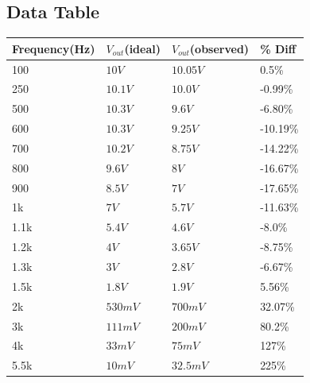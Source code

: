 \documentclass[11pt]{article}
\begin{document}
	\subsection*{Data Table}
		\begin{table}[H]
		\def\arraystretch{1.2}%
		\centering
		\begin{tabular}{|l|l|l|l|}
			\hline
			Frequency(Hz)		& $V_{out}$(ideal)		&  $V_{out}$(observed) 			&\% Diff	\\ \hline
			100  				& $10V$						& $10.05V$        			&0.5\%		\\ \hline	
			250					& $10.1V $					& $10.0V $    				&-0.99\%	\\ \hline
			500					& $10.3V$					& $9.6V$					&-6.80\%	\\ \hline
			600					& $10.3V$					& $9.25V$					&-10.19\%	\\ \hline
			700					& $10.2V$					& $8.75V$					&-14.22\%	\\ \hline
			800					& $9.6V$					& $8V$						&-16.67\%	\\ \hline
			900					& $8.5V$					& $7V$						&-17.65\%	\\ \hline
			1k					& $7V$						& $5.7V$					&-11.63\%	\\ \hline
			1.1k				& $5.4V$					& $4.6V$					&-8.0\%		\\ \hline
			1.2k				& $4V$						& $3.65V$					&-8.75\%	\\ \hline
			1.3k				& $3V$						& $2.8V$					&-6.67\%	\\ \hline
			1.5k				& $1.8V$					& $1.9V$					&5.56\%		\\ \hline
			2k					& $530mV$					& $700mV$					&32.07\%	\\ \hline
			3k					& $111mV$					& $200mV$					&80.2\%		\\ \hline
			4k					& $33mV$					& $75mV$					&127\%		\\ \hline
			5.5k				& $10mV$					& $32.5mV$					&225\%		\\ \hline				
	\end{tabular}
	\end{table}
\end{document}
